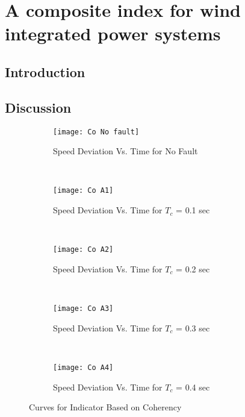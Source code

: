 \chapter{A composite index for wind integrated power systems}

\section{Introduction}

\pagebreak
\section{Discussion}
\begin{figure}[H]
\centering
\begin{subfigure}{1\textwidth}
  \centering
  \texttt{[image: Co No fault]}
  \caption{Speed Deviation Vs. Time for No Fault}
  \label{fig:I1sub1}
\end{subfigure}%
\\
\begin{subfigure}{1\textwidth}
  \centering
  \texttt{[image: Co A1]}
  \caption{Speed Deviation Vs. Time for \(T_c\) = 0.1 sec}
  \label{fig:I1sub2}
\end{subfigure}
\\
\begin{subfigure}{1\textwidth}
  \centering
  \texttt{[image: Co A2]}
  \caption{Speed Deviation Vs. Time for \(T_c\) = 0.2 sec}
  \label{fig:I1sub3}
\end{subfigure}%
\\
\begin{subfigure}{1\textwidth}
  \centering
  \texttt{[image: Co A3]}
  \caption{Speed Deviation Vs. Time for \(T_c\) = 0.3 sec}
  \label{fig:I1sub4}
\end{subfigure}
\\
\begin{subfigure}{1\textwidth}
  \centering
  \texttt{[image: Co A4]}
  \caption{Speed Deviation Vs. Time for \(T_c\) = 0.4 sec}
  \label{fig:I1sub5}
\end{subfigure}
\caption{Curves for Indicator Based on Coherency}
\label{fig:I1}
\end{figure}
